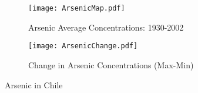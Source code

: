 \documentclass{article}[12pt,subeqn]
\begin{document}
\begin{spacing}{1.4}
\newpage
\begin{figure}
\centering
\begin{subfigure}{.5\textwidth}
  \centering
  \texttt{[image: ArsenicMap.pdf]}
  \caption{Arsenic Average Concentrations: 1930-2002}
  \label{fig:sub1}
\end{subfigure}%
\begin{subfigure}{.5\textwidth}
  \centering
  \texttt{[image: ArsenicChange.pdf]}
  \caption{Change in Arsenic Concentrations (Max-Min)}
  \label{fig:sub2}
\end{subfigure}
\caption{Arsenic in Chile}
\label{fig:test}
\end{figure}


\clearpage

\newpage


\end{spacing}
\end{document}
